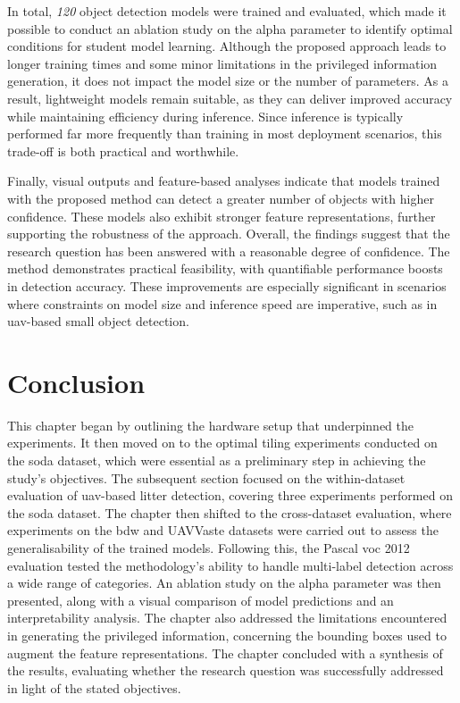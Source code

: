 In total, \textit{120} object detection models were trained and evaluated, which made it possible to conduct an ablation study on the \gls{alpha} parameter to identify optimal conditions for student model learning. Although the proposed approach leads to longer training times and some minor limitations in the privileged information generation, it does not impact the model size or the number of parameters. As a result, lightweight models remain suitable, as they can deliver improved accuracy while maintaining efficiency during inference. Since inference is typically performed far more frequently than training in most deployment scenarios, this trade-off is both practical and worthwhile.

Finally, visual outputs and feature-based analyses indicate that models trained with the proposed method can detect a greater number of objects with higher confidence. These models also exhibit stronger feature representations, further supporting the robustness of the approach. Overall, the findings suggest that the research question has been answered with a reasonable degree of confidence. The method demonstrates practical feasibility, with quantifiable performance boosts in detection accuracy. These improvements are especially significant in scenarios where constraints on model size and inference speed are imperative, such as in \gls{uav}-based small object detection.



\section{Conclusion}
\label{sec:5_conclusion}


This chapter began by outlining the hardware setup that underpinned the experiments. It then moved on to the optimal tiling experiments conducted on the \gls{soda} dataset, which were essential as a preliminary step in achieving the study's objectives. The subsequent section focused on the within-dataset evaluation of \gls{uav}-based litter detection, covering three experiments performed on the \gls{soda} dataset. The chapter then shifted to the cross-dataset evaluation, where experiments on the \gls{bdw} and UAVVaste datasets were carried out to assess the generalisability of the trained models. Following this, the Pascal \gls{voc} 2012 evaluation tested the methodology’s ability to handle multi-label detection across a wide range of categories. An ablation study on the alpha parameter was then presented, along with a visual comparison of model predictions and an interpretability analysis. The chapter also addressed the limitations encountered in generating the privileged information, concerning the bounding boxes used to augment the feature representations. The chapter concluded with a synthesis of the results, evaluating whether the research question was successfully addressed in light of the stated objectives.
